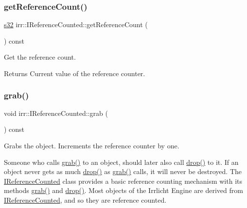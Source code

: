 \subsubsection{\texorpdfstring{get\+Reference\+Count()}{getReferenceCount()}}
{\footnotesize\ttfamily \hyperlink{namespaceirr_ac66849b7a6ed16e30ebede579f9b47c6}{s32} irr\+::\+I\+Reference\+Counted\+::get\+Reference\+Count (\begin{DoxyParamCaption}{ }\end{DoxyParamCaption}) const\hspace{0.3cm}{\ttfamily [inline]}}



Get the reference count. 

\begin{DoxyReturn}{Returns}
Current value of the reference counter. 
\end{DoxyReturn}
\mbox{\label{classirr_1_1IReferenceCounted_a396f9cdbe311ada278626477b3c6f0f5}} 
\subsubsection{\texorpdfstring{grab()}{grab()}}
{\footnotesize\ttfamily void irr\+::\+I\+Reference\+Counted\+::grab (\begin{DoxyParamCaption}{ }\end{DoxyParamCaption}) const\hspace{0.3cm}{\ttfamily [inline]}}



Grabs the object. Increments the reference counter by one. 

Someone who calls \hyperlink{classirr_1_1IReferenceCounted_a396f9cdbe311ada278626477b3c6f0f5}{grab()} to an object, should later also call \hyperlink{classirr_1_1IReferenceCounted_a03856a09355b89d178090c4a5f738543}{drop()} to it. If an object never gets as much \hyperlink{classirr_1_1IReferenceCounted_a03856a09355b89d178090c4a5f738543}{drop()} as \hyperlink{classirr_1_1IReferenceCounted_a396f9cdbe311ada278626477b3c6f0f5}{grab()} calls, it will never be destroyed. The \hyperlink{classirr_1_1IReferenceCounted}{I\+Reference\+Counted} class provides a basic reference counting mechanism with its methods \hyperlink{classirr_1_1IReferenceCounted_a396f9cdbe311ada278626477b3c6f0f5}{grab()} and \hyperlink{classirr_1_1IReferenceCounted_a03856a09355b89d178090c4a5f738543}{drop()}. Most objects of the Irrlicht Engine are derived from \hyperlink{classirr_1_1IReferenceCounted}{I\+Reference\+Counted}, and so they are reference counted.

